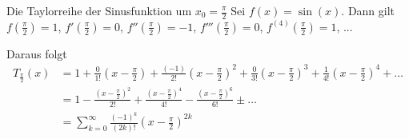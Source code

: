 \begin{bsp}
	{Die Taylorreihe der Sinusfunktion um $x_0=\frac{\pi}{2}$}{}
	Sei \( f(x) = \sin(x) \). Dann gilt \( f\left(\frac{\pi}{2}\right) = 1 \), \( f'\left(\frac{\pi}{2}\right) = 0 \), \( f''\left(\frac{\pi}{2}\right) = -1 \), \( f'''\left(\frac{\pi}{2}\right) = 0 \), \( f^{(4)}\left(\frac{\pi}{2}\right) = 1 \), ...

	Daraus folgt
	\begin{align*}
		T_{\frac{\pi}{2}}(x) & = 1 + \frac{0}{1!}\left(x-\frac{\pi}{2}\right) + \frac{\left(-1\right)}{2!}\left(x-\frac{\pi}{2}\right)^2 + \frac{0}{3!}\left(x-\frac{\pi}{2}\right)^3 + \frac{1}{4!}\left(x-\frac{\pi}{2}\right)^4 + \ldots \\
		                     & = 1 - \frac{\left(x-\frac{\pi}{2}\right)^2}{2!} + \frac{\left(x-\frac{\pi}{2}\right)^4}{4!} - \frac{\left(x-\frac{\pi}{2}\right)^6}{6!} \pm \ldots                                                           \\
		                     & = \sum_{k=0}^{\infty} \frac{\left(-1\right)^k}{\left(2k\right)!}\left(x-\frac{\pi}{2}\right)^{2k}
	\end{align*}



\end{bsp}
